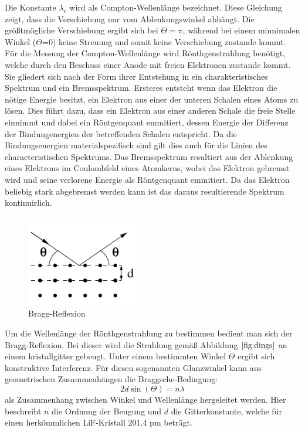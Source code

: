 Die Konstante $\lambda_c$ wird als Compton-Wellenlänge bezeichnet. Diese Gleichung zeigt, dass die Verschiebung nur
vom Ablenkungswinkel abhängt. Die größtmögliche Verschiebung ergibt sich bei $\Theta=\pi$, während bei einem minnimalen Winkel ($\Theta$=0) keine Streuung und somit keine Verschiebung zustande kommt. \\
Für die Messung der Compton-Wellenlänge wird Rönthgenstrahlung benötigt, welche durch den Beschuss einer Anode mit freien Elektronen zustande kommt. Sie gliedert sich nach der Form ihrer Entstehung in ein charakteristisches Spektrum und ein Bremsspektrum. Ersteres entsteht wenn das Elektron die nötige Energie besitzt, ein Elektron aus einer der unteren Schalen eines Atoms zu lösen. Dies führt dazu, dass ein Elektron aus einer anderen Schale die freie Stelle einnimmt und dabei ein Röntgenquant emmitiert, dessen Energie der Differenz der Bindungenergien der betreffenden Schalen entspricht. Da die Bindungsenergien materialspezifisch sind gilt dies auch für die Linien des characteristischen Spektrums.
Das Bremsspektrum resultiert aus der Ablenkung eines Elektrons im Coulombfeld eines Atomkerns, wobei das Elektron gebremst wird und seine verlorene Energie als Röntgenquant emmitiert. Da das Elektron beliebig stark abgebremst werden kann ist das daraus resultierende Spektrum kontinuirlich. \\
\begin{figure} [h!]
    \centering
    \includegraphics[height=4cm, keepaspectratio]{Bragg-Reflexion}
    \caption{Bragg-Reflexion}
    \label{fig:dings}
 \end{figure}
Um die Wellenlänge der Rönthgenstrahlung zu bestimmen bedient man sich der Bragg-Reflexion. Bei dieser wird die Strahlung gemäß Abbildung $\ref{fig:dings}$ an einem kristallgitter gebeugt. Unter einem bestimmten Winkel $\Theta$ ergibt sich konstruktive Interferenz. Für diesen sogenannten Glanzwinkel kann aus geometrischen Zusammenhängen die Braggsche-Bedingung:
\begin{equation}
2d\sin(\Theta)=n\lambda
\end{equation}
als Zusammenhang zwischen Winkel und Wellenlänge hergeleitet werden. Hier beschreibt $n$ die Ordnung der Beugung und $d$ die Gitterkonstante, welche für einen herkömmlichen LiF-Kristall $201.4$ pm beträgt. \\
